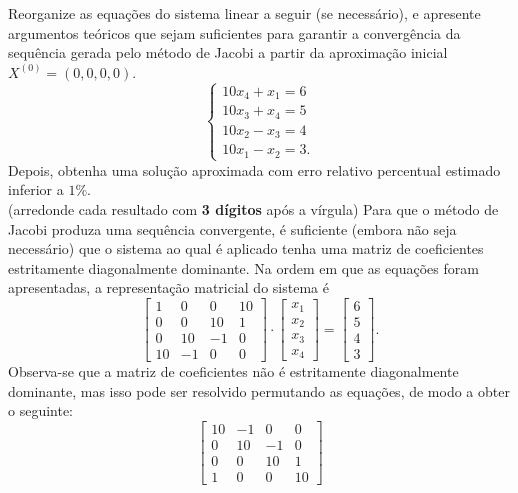 \documentclass[12pt,a4paper]{article}
\begin{document}
\begin{ExerciseList}
\Exercise[title={2,5}]
Reorganize as equações do sistema linear a seguir (se necessário), e apresente argumentos teóricos que sejam suficientes para garantir a convergência da sequência gerada pelo método de Jacobi a partir da aproximação inicial $X^{(0)} = (0,0,0,0)$.
\[
\begin{cases}
10x_4+x_1 = 6\\
10x_3+x_4 = 5\\
10x_2-x_3 = 4\\
10x_1-x_2 = 3.
\end{cases}
\]
Depois, obtenha uma solução aproximada com erro relativo percentual estimado inferior a $1\%$.\\
(arredonde cada resultado com \textbf{3 dígitos} após a vírgula)
\Answer
Para que o método de Jacobi produza uma sequência convergente, é suficiente (embora não seja necessário) que o sistema ao qual é aplicado tenha uma matriz de coeficientes estritamente diagonalmente dominante. Na ordem em que as equações foram apresentadas, a representação matricial do sistema é
\[
\begin{bmatrix}
 1 &  0 &  0 & 10 \\
 0 &  0 & 10 & 1 \\
 0 & 10 & -1 & 0 \\
10 & -1 &  0 & 0
\end{bmatrix}
\cdot
\begin{bmatrix}
x_1 \\ x_2 \\ x_3 \\ x_4
\end{bmatrix}
=
\begin{bmatrix}
6 \\ 5 \\ 4 \\ 3
\end{bmatrix}.
\]
Observa-se que a matriz de coeficientes não é estritamente diagonalmente dominante, mas isso pode ser resolvido permutando as equações, de modo a obter o seguinte:
\[
\begin{bmatrix}
10 & -1 &  0 & 0 \\
 0 & 10 & -1 & 0 \\
 0 &  0 & 10 & 1 \\
 1 &  0 &  0 & 10
\end{bmatrix}
\]
\end{ExerciseList}
\end{document}
